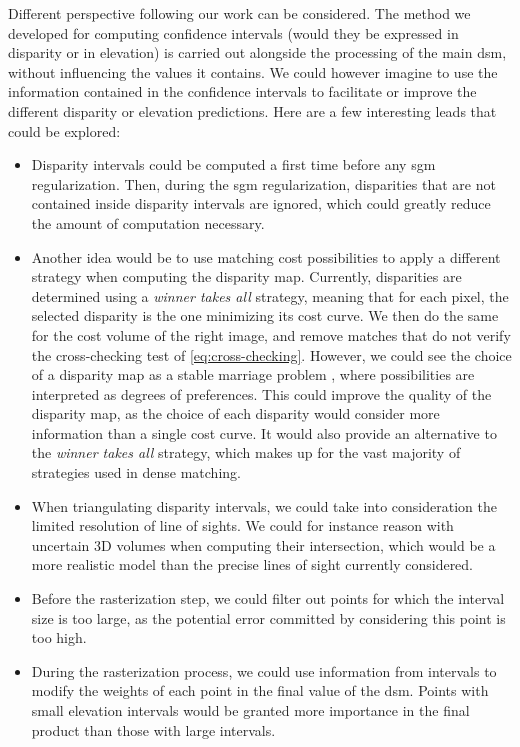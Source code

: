 Different perspective following our work can be considered. The method we developed for computing confidence intervals (would they be expressed in disparity or in elevation) is carried out alongside the processing of the main \acrshort{dsm}, without influencing the values it contains. We could however imagine to use the information contained in the confidence intervals to facilitate or improve the different disparity or elevation predictions. Here are a few interesting leads that could be explored:
\begin{itemize}
    \item Disparity intervals could be computed a first time before any \acrshort{sgm} regularization. Then, during the \acrshort{sgm} regularization, disparities that are not contained inside disparity intervals are ignored, which could greatly reduce the amount of computation necessary. 
    \item Another idea would be to use matching cost possibilities to apply a different strategy when computing the disparity map. Currently, disparities are determined using a \textit{winner takes all} strategy, meaning that for each pixel, the selected disparity is the one minimizing its cost curve. We then do the same for the cost volume of the right image, and remove matches that do not verify the cross-checking test of \cref{eq:cross-checking}. However, we could see the choice of a disparity map as a stable marriage problem \cite{irving_matching_1998}, where possibilities are interpreted as degrees of preferences. This could improve the quality of the disparity map, as the choice of each disparity would consider more information than a single cost curve. It would also provide an alternative to the \textit{winner takes all} strategy, which makes up for the vast majority of strategies used in dense matching.  
    \item When triangulating disparity intervals, we could take into consideration the limited resolution of line of sights. We could for instance reason with uncertain 3D volumes when computing their intersection, which would be a more realistic model than the precise lines of sight currently considered.
    \item Before the rasterization step, we could filter out points for which the interval size is too large, as the potential error committed by considering this point is too high. 
    \item During the rasterization process, we could use information from intervals to modify the weights of each point in the final value of the \acrshort{dsm}. Points with small elevation intervals would be granted more importance in the final product than those with large intervals. 
\end{itemize}

\youshallnotpass
\pagebreak